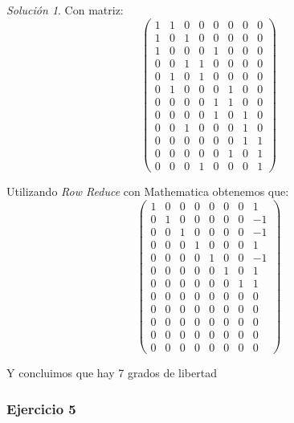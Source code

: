 \documentclass[notitlepage]{article}
\theoremstyle{definition}
\theoremstyle{remark}
\newtheorem*{sol}{Solución}
\begin{document}
\begin{itemize}
\begin{sol}
			Con matriz:
			\begin{equation}
			\begin{pmatrix}
			1 & 1 & 0 & 0 & 0 & 0 & 0 & 0 \\
			1 & 0 & 1 & 0 & 0 & 0 & 0 & 0 \\
			1 & 0 & 0 & 0 & 1 & 0 & 0 & 0 \\
			0 & 0 & 1 & 1 & 0 & 0 & 0 & 0 \\
			0 & 1 & 0 & 1 & 0 & 0 & 0 & 0 \\
			0 & 1 & 0 & 0 & 0 & 1 & 0 & 0 \\
			0 & 0 & 0 & 0 & 1 & 1 & 0 & 0 \\
			0 & 0 & 0 & 0 & 1 & 0 & 1 & 0 \\
			0 & 0 & 1 & 0 & 0 & 0 & 1 & 0 \\
			0 & 0 & 0 & 0 & 0 & 0 & 1 & 1 \\
			0 & 0 & 0 & 0 & 0 & 1 & 0 & 1 \\
			0 & 0 & 0 & 1 & 0 & 0 & 0 & 1
			\end{pmatrix} \nonumber
			\end{equation}
			
			Utilizando \textit{Row Reduce} con Mathematica obtenemos que:
			\begin{equation}
			\begin{pmatrix}
			1 & 0 & 0 & 0 & 0 & 0 & 0 & 1 \\
			0 & 1 & 0 & 0 & 0 & 0 & 0 & -1 \\
			0 & 0 & 1 & 0 & 0 & 0 & 0 & -1 \\
			0 & 0 & 0 & 1 & 0 & 0 & 0 & 1 \\
			0 & 0 & 0 & 0 & 1 & 0 & 0 & -1 \\
			0 & 0 & 0 & 0 & 0 & 1 & 0 & 1 \\
			0 & 0 & 0 & 0 & 0 & 0 & 1 & 1 \\
			0 & 0 & 0 & 0 & 0 & 0 & 0 & 0 \\
			0 & 0 & 0 & 0 & 0 & 0 & 0 & 0 \\
			0 & 0 & 0 & 0 & 0 & 0 & 0 & 0 \\
			0 & 0 & 0 & 0 & 0 & 0 & 0 & 0 \\
			0 & 0 & 0 & 0 & 0 & 0 & 0 & 0
			\end{pmatrix} \nonumber
			\end{equation}
			
			Y concluimos que hay 7 grados de libertad
		\end{sol}
	\end{itemize}
	
 	\subsubsection*{Ejercicio 5}
	
\end{document}
